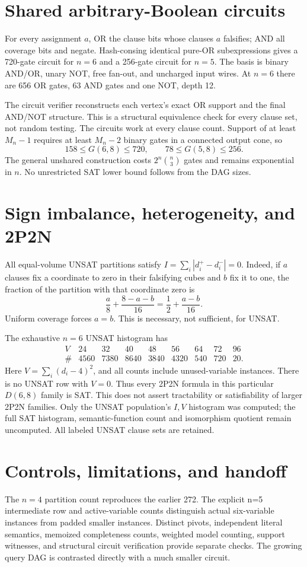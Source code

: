 \documentclass[11pt]{article}
\begin{document}
\section*{Shared arbitrary-Boolean circuits}
For every assignment $a$, OR the clause bits whose clauses $a$ falsifies;
AND all coverage bits and negate. Hash-consing identical pure-OR subexpressions
gives a 720-gate circuit for $n=6$ and a 256-gate circuit for $n=5$.
The basis is binary AND/OR, unary NOT, free fan-out, and uncharged input wires.
At $n=6$ there are 656 OR gates, 63 AND gates and one NOT, depth 12.

The circuit verifier reconstructs each vertex's exact OR support and the final
AND/NOT structure. This is a structural equivalence check for every clause set,
not random testing. The circuits work at every clause count. Support of at
least $M_n-1$ requires at least $M_n-2$ binary gates in a connected output cone,
so
\[
158\le G(6,8)\le720,\qquad 78\le G(5,8)\le256.
\]
The general unshared construction costs $2^n\binom n3$ gates and remains
exponential in $n$. No unrestricted SAT lower bound follows from the DAG sizes.

\section*{Sign imbalance, heterogeneity, and 2P2N}
All equal-volume UNSAT partitions satisfy $I=\sum_i|d_i^+-d_i^-|=0$.
Indeed, if $a$ clauses fix a coordinate to zero in their falsifying cubes and
$b$ fix it to one, the fraction of the partition with that coordinate zero is
\[
\frac a8+\frac{8-a-b}{16}=\frac12+\frac{a-b}{16}.
\]
Uniform coverage forces $a=b$. This is necessary, not sufficient, for UNSAT.

The exhaustive $n=6$ UNSAT histogram has
\[
\begin{array}{c|rrrrrrrr}
V&24&32&40&48&56&64&72&96\\\hline
\#&4560&7380&8640&3840&4320&540&720&20.
\end{array}
\]
Here $V=\sum_i(d_i-4)^2$, and all counts include unused-variable instances.
There is no UNSAT row with $V=0$. Thus every 2P2N formula in this particular
$D(6,8)$ family is SAT. This does not assert tractability or satisfiability of
larger 2P2N families. Only the UNSAT population's $I,V$ histogram was computed;
the full SAT histogram, semantic-function count and isomorphism quotient remain
uncomputed. All labeled UNSAT clause sets are retained.

\section*{Controls, limitations, and handoff}
The $n=4$ partition count reproduces the earlier 272. The explicit n=5
intermediate row and active-variable counts distinguish actual six-variable
instances from padded smaller instances. Distinct pivots, independent literal
semantics, memoized completeness counts, weighted model counting, support
witnesses, and structural circuit verification provide separate checks.
The growing query DAG is contrasted directly with a much smaller circuit.
\end{document}
